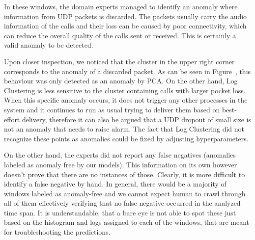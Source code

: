 In these windows, the domain experts managed to identify an anomaly where information from UDP packets is discarded. The packets usually carry the audio information of the calls and their loss can be caused by poor connectivity, which can reduce the overall quality of the calls sent or received. This is certainly a valid anomaly to be detected. 

Upon closer inspection, we noticed that the cluster in the upper right corner corresponds to the anomaly of a discarded packet. As can be seen in Figure~\label{fig:tsne-unslabeled-plots}, this behaviour was only detected as an anomaly by PCA. On the other hand, Log Clustering is less sensitive to the cluster containing calls with larger pocket loss. When this specific anomaly occurs, it does not trigger any other processes in the system and it continues to run as usual trying to deliver them based on best-effort delivery, therefore it can also be argued that a UDP dropout of small size is not an anomaly that needs to raise alarm. The fact that Log Clustering did not recognize these points as anomalies could be fixed by adjusting hyperparameters.

On the other hand, the experts did not report any false negatives (anomalies labeled as anomaly free by our models). This information on its own however doesn't prove that there are no instances of those.
Clearly, it is more difficult to identify a false negative by hand. In general, there would be a majority of windows labeled as anomaly-free and we cannot expect human to crawl through all of them effectively verifying that no false negative occurred in the analyzed time span. It is understandable, that a bare eye is not able to spot these just based on the histogram and logs assigned to each of the windows, that are meant for troubleshooting the predictions.